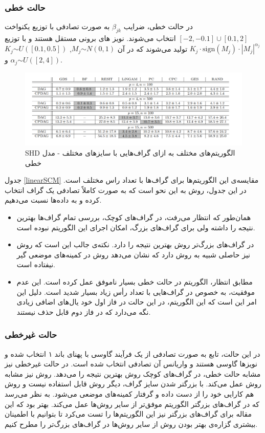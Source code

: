 \documentclass[a4paper,12pt]{article}
\begin{document}
\subsubsection{
حالت
خطی
}
در حالت خطی، ضرایب 
 $\beta_{jk}$
 به صورت تصادفی با توزیع یکنواخت 
 $[-2,-0.1] \cup [0.1,2]$
 انتخاب می‌شوند. نویز های برونی مستقل هستند و با توزیع 
 $K_j \cdot \mathrm{sign}(M_j)\cdot |M_j|^{\alpha_j}$
 تولید می‌شوند که در آن
 $M_j \stackrel{}{\sim} N(0,1)$, $K_j \stackrel{}{\sim} U([0.1,0.5])$ 
 و
  $\alpha_j \stackrel{}{\sim} U([2,4])$. 
\begin{figure}[h!]
	\centering
	\includegraphics[scale=0.42]{linear.png}
	\caption{SHD
الگوریتم‌های مختلف به ازای گراف‌هایی با سایز‌های مختلف	 - مدل خطی
}
\label{linearSCM}
\end{figure}
جدول  \eqref{linearSCM} مقایسه‌ی 
این الگوریتم‌ها برای گراف‌ها با تعداد راس مختلف است. 
در این جدول، روش 
به این نحو است که به صورت کاملاً تصادفی یک گراف انتخاب کرده و به داده‌ها نسبت می‌دهیم. 
\begin{itemize}
\item 
همان‌طور که انتظار می‌رفت، در گراف‌های کوچک، بررسی تمام گراف‌ها بهترین نتیجه را داشته ولی برای گراف‌های بزرگ، امکان اجرای این الگوریتم نبوده است.
\item 
در گراف‌های بزرگ‌تر روش 
بهترین نتیجه را دارد. نکته‌ی جالب این است که روش 
نیز حاصلی شبیه به روش 
دارد که نشان می‌دهد روش 
 در کمینه‌های موضعی گیر نیفتاده است.
 \item 
 مطابق انتظار، الگوریتم
 در حالت خطی بسیار ناموفق عمل کرده است. این عدم موفقیت، به خصوص در گراف‌هایی با تعداد رأس زیاد بسیار شدید است. دلیل این امر این است که این الگوریتم، در این حالت در فاز اول خود یال‌های اضافی زیادی نگه می‌دارد که در فاز دوم قابل حذف نیستند.

\end{itemize}

\subsubsection{حالت 
غیرخطی
}
در این حالت، تابع به صورت تصادفی از  یک فرآیند گاوسی با پهنای باند ۱ انتخاب شده و نویز‌ها گاوسی هستند و واریانس آن تصادفی انتخاب شده است.
در حالت غیرخطی نیز مشابه حالت خطی، در گراف‌های کوچک روش 
بهترین نتیجه را می‌دهد. روش 
نیز مشابه روش 
عمل می‌کند. با بزرگتر شدن سایز گراف، دیگر روش 
قابل استفاده نیست و روش
هم کارایی خود را از دست داده و گرفتار کمینه‌های موضعی می‌شود. به نظر می‌رسد که در گراف‌های بزرگتر الگوریتم
موفق‌تر از سایر روش‌ها عمل می‌کند. بهتر بود که این مقاله برای گراف‌های بزرگتر نیز این الگوریتم‌ها را تست می‌کرد تا بتوانیم با اطمینان بیشتری گزاره‌ی بهتر بودن روش 
از سایر روش‌ها در گراف‌های بزرگ‌تر را مطرح کنیم.
\end{document}
